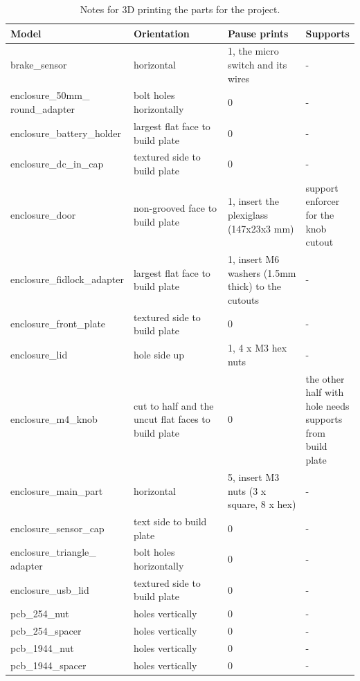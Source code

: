 \documentclass[a4paper,11pt]{article}
\begin{document}
\begin{longtable}{ |p{0.35\linewidth} | p{0.3\linewidth}| p{0.25\linewidth}| p{0.15\linewidth}|} 
    \caption{Notes for 3D printing the parts for the project.}
    \label{tab:printing}\\
     \hline
     Model & Orientation & Pause prints & Supports \\ 
     \hline
     \hline
     brake\_sensor & horizontal & 1, the micro switch and its wires & - \\
     \hline
     enclosure\_50mm\_ round\_adapter &	bolt holes horizontally &	0 &	-\\
     \hline
     enclosure\_battery\_holder &	largest flat face to build plate &	0 &	-\\
     \hline
     enclosure\_dc\_in\_cap &	textured side to build plate &	0 &	-\\
     \hline
     enclosure\_door &	non-grooved face to build plate &	1, insert the plexiglass (147x23x3 mm) &	support enforcer for the knob cutout\\
     \hline
     enclosure\_fidlock\_adapter	& largest flat face to build plate &	1, insert M6 washers (1.5mm thick) to the cutouts &	-\\
     \hline
     enclosure\_front\_plate &	textured side to build plate &	0 &	-\\
     \hline
     enclosure\_lid &	hole side up &	1, 4 x M3 hex nuts &	-\\
     \hline
     enclosure\_m4\_knob &	cut to half and the uncut flat faces to build plate &	0 &	the other half with hole needs supports from build plate\\
     \hline
     enclosure\_main\_part &	horizontal &	5, insert M3 nuts (3 x square, 8 x hex) &	- \\
     \hline
     \newpage
     \hline
     enclosure\_sensor\_cap &	text side to build plate &	0 &	-\\
     \hline
     enclosure\_triangle\_ adapter &	bolt holes horizontally &	0 &	-\\
     \hline
     enclosure\_usb\_lid &	textured side to build plate &	0 &	-\\
     \hline
     pcb\_254\_nut &	holes vertically &	0 &	-\\
     \hline
     pcb\_254\_spacer &	holes vertically &	0 &	-\\
     \hline
     pcb\_1944\_nut &	holes vertically &	0 &	-\\
     \hline
     pcb\_1944\_spacer &	holes vertically &	0 &	-\\

\end{longtable}
\end{document}
